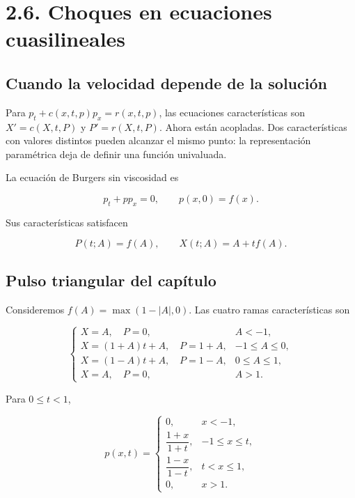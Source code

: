 \documentclass[11pt,a4paper]{article}
\begin{document}
\hypertarget{choques-en-ecuaciones-cuasilineales}{%
\section{2.6. Choques en ecuaciones
cuasilineales}\label{choques-en-ecuaciones-cuasilineales}}

\hypertarget{cuando-la-velocidad-depende-de-la-soluciuxf3n}{%
\subsection{Cuando la velocidad depende de la
solución}\label{cuando-la-velocidad-depende-de-la-soluciuxf3n}}

Para \(p_t+c(x,t,p)p_x=r(x,t,p)\), las ecuaciones características son
\(X'=c(X,t,P)\) y \(P'=r(X,t,P)\). Ahora están acopladas. Dos
características con valores distintos pueden alcanzar el mismo punto: la
representación paramétrica deja de definir una función univaluada.

La ecuación de Burgers sin viscosidad es

\[p_t+pp_x=0,\qquad p(x,0)=f(x).\]

Sus características satisfacen

\[P(t;A)=f(A),\qquad X(t;A)=A+tf(A).\]

\hypertarget{pulso-triangular-del-capuxedtulo}{%
\subsection{Pulso triangular del
capítulo}\label{pulso-triangular-del-capuxedtulo}}

Consideremos \(f(A)=\max(1-|A|,0)\). Las cuatro ramas características
son

\[\begin{cases}
X=A,\quad P=0,&A<-1,\\
X=(1+A)t+A,\quad P=1+A,&-1\le A\le0,\\
X=(1-A)t+A,\quad P=1-A,&0\le A\le1,\\
X=A,\quad P=0,&A>1.
\end{cases}\tag{2.42}\]

Para \(0\le t<1\),

\[p(x,t)=\begin{cases}
0,&x<-1,\\
\dfrac{1+x}{1+t},&-1\le x\le t,\\
\dfrac{1-x}{1-t},&t<x\le1,\\
0,&x>1.
\end{cases}\tag{2.43}\]
\end{document}
